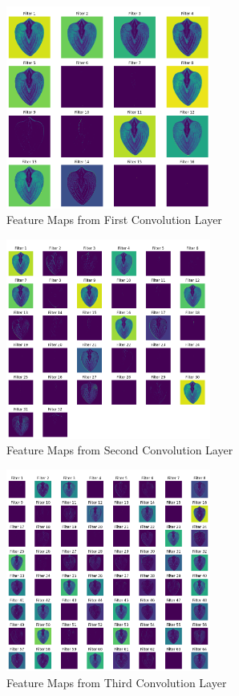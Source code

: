 \begin{figure}[!htbp]
	\centering
	\includegraphics[width=0.6\textwidth]{figures/conv1.png}
	\caption{Feature Maps from First Convolution Layer}
\end{figure}

\begin{figure}[!htbp]
	\centering
	\includegraphics[width=0.6\textwidth]{figures/conv2.png}
	\caption{Feature Maps from Second Convolution Layer}
\end{figure}

\begin{figure}[!htbp]
	\centering
	\includegraphics[width=0.6\textwidth]{figures/conv3.png}
	\caption{Feature Maps from Third Convolution Layer}
\end{figure}